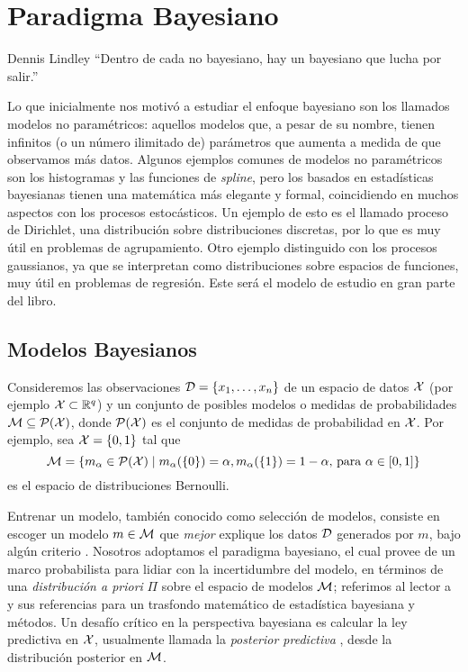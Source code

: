 
\chapter{Paradigma Bayesiano}

\begin{chapquote}{Dennis Lindley}
	``Dentro de cada no bayesiano, hay un bayesiano que lucha por salir.''
\end{chapquote}

Lo que inicialmente nos motivó a estudiar el enfoque bayesiano son los llamados modelos no paramétricos: aquellos modelos que, a pesar de su nombre, tienen infinitos (o un número ilimitado de) parámetros que aumenta a medida de que observamos más datos. Algunos ejemplos comunes de modelos no paramétricos son los histogramas y las funciones de \emph{spline}, pero los basados en estadísticas bayesianas tienen una matemática más elegante y formal, coincidiendo en muchos aspectos con los procesos estocásticos. Un ejemplo de esto es el llamado proceso de Dirichlet, una distribución sobre distribuciones discretas, por lo que es muy útil en problemas de agrupamiento. Otro ejemplo distinguido con los procesos gaussianos, ya que se interpretan como distribuciones sobre espacios de funciones, muy útil en problemas de regresión. Este será el modelo de estudio en gran parte del libro.

\section{Modelos Bayesianos}

Consideremos las observaciones \(\mathcal{D} = \{x_1, \dotsc, x_n\}\) de un espacio de datos \( \mathcal{X}\) (por ejemplo \(\mathcal{X} \subset \mathbb{R}^q\)) y un conjunto de posibles modelos o medidas de probabilidades \(\mathcal{M} \subseteq \mathcal{P}(\mathcal{X})\), donde \(\mathcal{P}(\mathcal{X})\) es el conjunto de medidas de probabilidad en \(\mathcal{X}\). Por ejemplo, sea \(\mathcal{X}=\{0,1\}\) tal que \[\mathcal{M} = \{m_{\alpha} \in \mathcal{P}(\mathcal{X}) \mid m_\alpha(\{0\})=\alpha, m_\alpha(\{1\})=1-\alpha\text{, para } \alpha \in [0,1] \}\] es el espacio de distribuciones Bernoulli.


Entrenar un modelo, también conocido como selección de modelos, consiste en escoger un modelo \(m \in \mathcal{M}\) que \emph{mejor} explique los datos \(\mathcal{D}\) generados por \(m\), bajo algún criterio \cite{chipman2001practical}. Nosotros adoptamos el paradigma bayesiano, el cual provee de un marco probabilista para lidiar con la incertidumbre del modelo, en términos de una \emph{distribución a priori} \(\Pi\) sobre el espacio de modelos \(\mathcal{M}\); referimos al lector a \cite{ghosal2017fundamentals, murphybook2012} y sus referencias para un trasfondo matemático de estadística bayesiana y métodos. Un desafío crítico en la perspectiva bayesiana es calcular la ley predictiva en \(\mathcal{X}\), usualmente llamada la \emph{posterior predictiva} \cite{gelman2013bayesian}, desde la distribución posterior en \(\mathcal{M}\).


